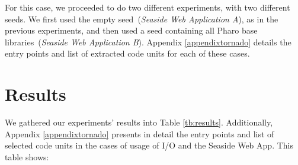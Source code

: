 For this case, we proceeded to do two different experiments, with two different seeds. We first used the empty seed~(\emph{Seaside Web Application A}), as in the previous experiments, and then used a seed containing all Pharo base libraries~(\emph{Seaside Web Application B}). Appendix \ref{appendixtornado} details the entry points and list of extracted code units for each of these cases.

\section{Results} \label{sec:results_discussion}

We gathered our experiments' results into Table \ref{tb:results}. Additionally, Appendix \ref{appendixtornado} presents in detail the entry points and list of selected code units in the cases of usage of I/O and the Seaside Web App. This table shows:
